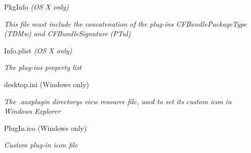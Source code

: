 \begin{DoxyItemize}
\begin{DoxyItemize}
\item Pkg\+Info {\itshape (OS X only) } 
\begin{DoxyItemize}
\item {\itshape This file must include the concatenation of the plug-\/in\textquotesingle{}s {\ttfamily C\+F\+Bundle\+Package\+Type} ({\ttfamily T\+D\+Mw}) and {\ttfamily C\+F\+Bundle\+Signature} ({\ttfamily P\+Tul})}  
\end{DoxyItemize}
\end{DoxyItemize}
\begin{DoxyItemize}
\item Info.\+plist {\itshape (OS X only) } 
\begin{DoxyItemize}
\item {\itshape The plug-\/in\textquotesingle{}s property list}  
\end{DoxyItemize}
\end{DoxyItemize}
\item desktop.\+ini (Windows only) 
\begin{DoxyItemize}
\item {\itshape The .aaxplugin directory\textquotesingle{}s view resource file, used to set its custom icon in Windows Explorer}  
\end{DoxyItemize}
\item Plug\+In.\+ico (Windows only) 
\begin{DoxyItemize}
\item {\itshape Custom plug-\/in icon file}  
\end{DoxyItemize}
\end{DoxyItemize}

